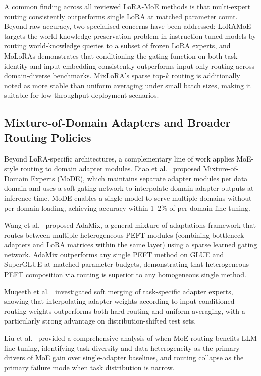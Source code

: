 A common finding across all reviewed LoRA-MoE methods is that multi-expert routing
consistently outperforms single LoRA at matched parameter count. Beyond raw accuracy,
two specialised concerns have been addressed: LoRAMoE \cite{DouLoRAMoE2024} targets the
world knowledge preservation problem in instruction-tuned models by routing
world-knowledge queries to a subset of frozen LoRA experts, and MoLoRAs
\cite{FengMoLoRAs2024} demonstrates that conditioning the gating function on both task
identity and input embedding consistently outperforms input-only routing across
domain-diverse benchmarks. MixLoRA's sparse top-$k$ routing is additionally noted as
more stable than uniform averaging under small batch sizes, making it suitable for
low-throughput deployment scenarios.

\subsection{Mixture-of-Domain Adapters and Broader Routing Policies}
\label{sec:moe_routing:domain}

Beyond LoRA-specific architectures, a complementary line of work applies MoE-style
routing to domain adapter modules. Diao et al.~\cite{DiaomMoDE2023} proposed Mixture-of-Domain
Experts (MoDE), which maintains separate adapter modules per data domain and uses a
soft gating network to interpolate domain-adapter outputs at inference time. MoDE
enables a single model to serve multiple domains without per-domain loading, achieving
accuracy within 1--2\% of per-domain fine-tuning.

Wang et al.~\cite{WangAdaMix2022} proposed AdaMix, a general mixture-of-adaptations framework
that routes between multiple heterogeneous PEFT modules (combining bottleneck adapters
and LoRA matrices within the same layer) using a sparse learned gating network. AdaMix
outperforms any single PEFT method on GLUE and SuperGLUE at matched parameter budgets,
demonstrating that heterogeneous PEFT composition via routing is superior to any
homogeneous single method.

Muqeeth et al.~\cite{Muqeeth2024} investigated soft merging of task-specific adapter experts, showing
that interpolating adapter weights according to input-conditioned routing weights
outperforms both hard routing and uniform averaging, with a particularly strong
advantage on distribution-shifted test sets.

Liu et al.~\cite{LiuWhenMOE2024} provided a comprehensive analysis of when MoE routing benefits
LLM fine-tuning, identifying task diversity and data heterogeneity as the primary
drivers of MoE gain over single-adapter baselines, and routing collapse as the primary
failure mode when task distribution is narrow.

